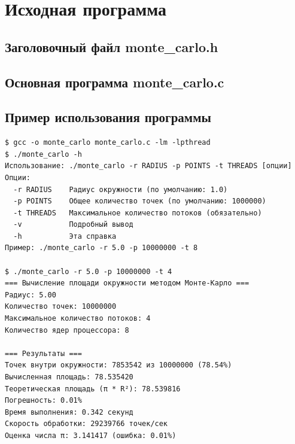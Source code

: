 \section{Исходная программа}

\subsection{Заголовочный файл monte\_carlo.h}
\begin{center}

\end{center}

\subsection{Основная программа monte\_carlo.c}
\begin{center}

\end{center}


\subsection{Пример использования программы}
\begin{verbatim}
$ gcc -o monte_carlo monte_carlo.c -lm -lpthread
$ ./monte_carlo -h
Использование: ./monte_carlo -r RADIUS -p POINTS -t THREADS [опции]
Опции:
  -r RADIUS    Радиус окружности (по умолчанию: 1.0)
  -p POINTS    Общее количество точек (по умолчанию: 1000000)
  -t THREADS   Максимальное количество потоков (обязательно)
  -v           Подробный вывод
  -h           Эта справка
Пример: ./monte_carlo -r 5.0 -p 10000000 -t 8

$ ./monte_carlo -r 5.0 -p 10000000 -t 4
=== Вычисление площади окружности методом Монте-Карло ===
Радиус: 5.00
Количество точек: 10000000
Максимальное количество потоков: 4
Количество ядер процессора: 8

=== Результаты ===
Точек внутри окружности: 7853542 из 10000000 (78.54%)
Вычисленная площадь: 78.535420
Теоретическая площадь (π * R²): 78.539816
Погрешность: 0.01%
Время выполнения: 0.342 секунд
Скорость обработки: 29239766 точек/сек
Оценка числа π: 3.141417 (ошибка: 0.01%)
\end{verbatim}

